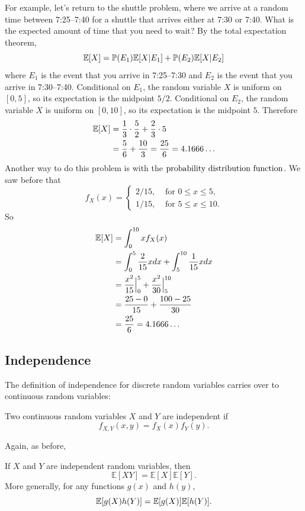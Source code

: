 \documentclass{ximera}
\begin{document}
For example, let's return to the shuttle problem, where we arrive at a random time between 7:25--7:40 for a shuttle that arrives either at 7:30 or 7:40. What is the expected amount of time that you need to wait? By the total expectation theorem,
$$
\mathbb{E}[X] = \mathbb{P}(E_1) \mathbb{E}[X \vert E_1] + \mathbb{P}(E_2)\mathbb{E}[X \vert E_2]
$$
where $E_1$ is the event that you arrive in 7:25--7:30 and $E_2$ is the event that you arrive in 7:30--7:40. Conditional on $E_1$, the random variable $X$ is uniform on $[0,5]$, so its expectation is the midpoint $5/2$. Conditional on $E_2$, the random variable $X$ is uniform on $[0,10]$, so its expectation is the midpoint $5$. Therefore
\begin{align*}
\mathbb{E}[X] &= \frac{1}{3} \cdot \frac{5}{2} + \frac{2}{3} \cdot 5 \\
&= \frac{5}{6} + \frac{10}{3} = \frac{25}{6} = 4.1666\ldots
\end{align*}
Another way to do this problem is with the $\text{probability distribution function}$. We saw before that
$$
f_X(x)
= 
\begin{cases}
2/15, & \text{ for } 0 \leq x \leq 5,\\
1/15, & \text{ for } 5 \leq x \leq 10.
\end{cases}
$$
So
\begin{align*}
\mathbb{E}[X] &= \int_0^{10} x f_X(x) \\
&= \int_0^5 \frac{2}{15}x dx + \int_5^{10} \frac{1}{15} xdx \\
&= \frac{x^2}{15} \Big|_0^5 + \frac{x^2}{30} \Big|_5^{10}\\
&= \frac{25-0}{15} + \frac{100-25}{30} \\
&= \frac{25}{6} = 4.1666\ldots
\end{align*}

\subsection{Independence}
The definition of independence for discrete random variables carries over to continuous random variables:
\begin{definition}
Two continuous random variables $X$ and $Y$ are independent if
$$
f_{X,Y}(x,y) = f_X(x) f_Y(y).
$$
\end{definition}
Again, as before,
\begin{theorem}
If $X$ and $Y$ are independent random variables, then
$$
\mathbb{E}[XY] = \mathbb{E}[X] \mathbb{E}[Y].
$$
More generally, for any functions $g(x)$ and $h(y)$, 
$$
\mathbb{E}[g(X)h(Y)] = \mathbb{E}[g(X)] \mathbb{E}[h(Y)].
$$
\end{theorem}
\end{document}

